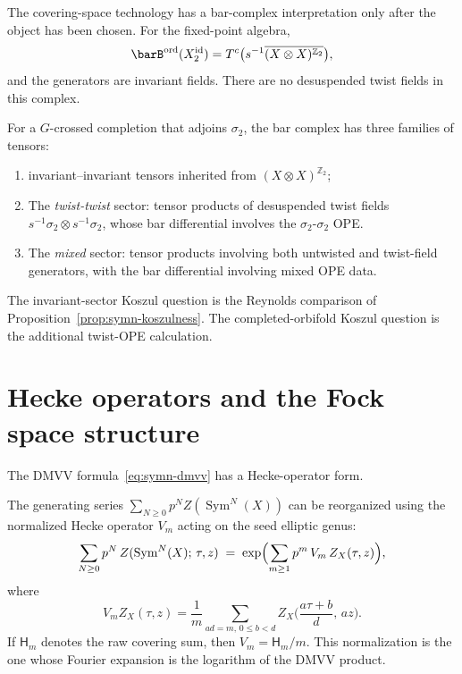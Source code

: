 \begin{remark}
\label{rem:sym2-covering-bar}
The covering-space technology has a bar-complex interpretation only
after the object has been chosen. For the fixed-point algebra,
\[
 \barB^{\mathrm{ord}}(X_2^{\mathrm{id}})
 = T^c\bigl(s^{-1}\overline{(X\otimes X)^{\mathbb Z_2}}\bigr),
\]
and the generators are invariant fields. There are no desuspended
twist fields in this complex.

For a $G$-crossed completion that adjoins $\sigma_2$, the bar
complex has three families of tensors:
\begin{enumerate}
\item invariant--invariant tensors inherited from
 $(X\otimes X)^{\mathbb Z_2}$;
\item The \emph{twist-twist} sector:
 tensor products of desuspended twist fields
 $s^{-1}\sigma_2 \otimes s^{-1}\sigma_2$, whose bar
 differential involves the $\sigma_2$-$\sigma_2$ OPE.
\item The \emph{mixed} sector: tensor products involving both
 untwisted and twist-field generators, with the bar
 differential involving mixed OPE data.
\end{enumerate}
The invariant-sector Koszul question is the Reynolds comparison of
Proposition~\ref{prop:symn-koszulness}. The completed-orbifold
Koszul question is the additional twist-OPE calculation.
\end{remark}



\section{Hecke operators and the Fock space structure}
\label{sec:symn-hecke}

The DMVV formula~\eqref{eq:symn-dmvv} has a Hecke-operator form.

\begin{proposition}
\label{prop:symn-hecke-form}
The generating series
$\sum_{N \geq 0} p^N Z(\operatorname{Sym}^N(X))$ can be
reorganized using the normalized Hecke operator $V_m$ acting on
the seed elliptic genus:
\begin{equation}\label{eq:symn-hecke}
 \sum_{N \geq 0} p^N\, Z(\operatorname{Sym}^N(X);\, \tau, z)
 \;=\; \exp\Bigl(\sum_{m \geq 1} p^m\,
 V_m\, Z_X(\tau, z)\Bigr),
\end{equation}
where
\begin{equation}\label{eq:symn-hecke-operator}
 V_m Z_X(\tau, z)
 =
 \frac{1}{m}\sum_{ad = m,\, 0 \leq b < d}
 Z_X\bigl(\frac{a\tau + b}{d},\, az\bigr).
\end{equation}
If $\mathsf H_m$ denotes the raw covering sum, then
$V_m=\mathsf H_m/m$. This normalization is the one whose Fourier
expansion is the logarithm of the DMVV product.
\end{proposition}

